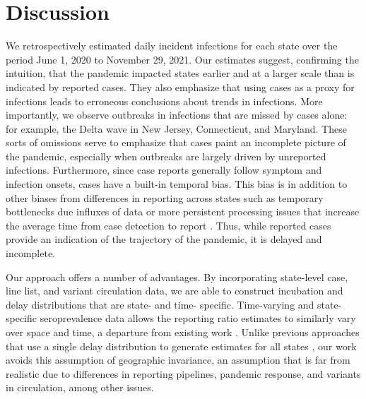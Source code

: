 \section{Discussion}

We retrospectively estimated daily incident infections for each \US state over
the period June 1, 2020 to November 29, 2021. Our estimates suggest, confirming
the intuition, that the pandemic impacted states earlier and at a larger scale
than is indicated by reported cases. They also emphasize that using cases as a
proxy for infections leads to erroneous conclusions about trends in infections.
More importantly, we observe outbreaks in infections that are missed by cases
alone: for example, the Delta wave in New Jersey, Connecticut, and Maryland.
These sorts of omissions serve to emphasize that cases paint an incomplete
picture of the pandemic, especially when outbreaks are largely driven by
unreported infections. Furthermore, since case reports generally follow symptom
and infection onsets, cases have a built-in temporal bias. This bias is in addition
to other biases from differences in reporting across states such as temporary
bottlenecks due influxes of data or more persistent processing issues that
increase the average time from case detection to report \citep{wash2020dash,
dunkel2020covid19}. Thus, while reported cases provide an indication of the
trajectory of the pandemic, it is delayed and incomplete.

Our approach offers a number of advantages. By incorporating state-level case,
line list, and variant circulation data, we are able to construct incubation and
delay distributions that are state- and time- specific. Time-varying and
state-specific seroprevalence data allows the reporting ratio estimates to
similarly vary over space and time, a departure from existing work
\citep{unwin2020state, uga2020covid19}. Unlike previous approaches that use a
single delay distribution to generate estimates for all states
\citep{chitwood2022reconstructing, jahja2022real}, our work avoids this
assumption of geographic invariance, an assumption that is far from realistic
due to differences in reporting pipelines, pandemic response, and variants in
circulation, among other issues. 

